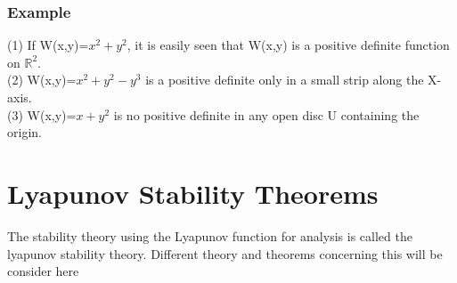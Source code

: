 \documentclass[a4paper,12pt]{report}
\numberwithin{equation}{section}
\begin{document}
\subsubsection*{Example}
(1) If W(x,y)=$ x^2 + y^2$, it is easily seen that W(x,y) is a positive definite function on $\mathbb{R}^2$. \\
(2) W(x,y)=$x^2 +y^2 - y^3$ is a positive definite only in a small strip along the X-axis. \\ 
(3) W(x,y)=$x +y^2 $ is no positive definite in  any open disc U containing the origin.
\section{Lyapunov Stability Theorems}
The stability theory using the Lyapunov function for analysis is called the lyapunov stability theory. Different theory and theorems concerning this will be consider here
\end{document}

